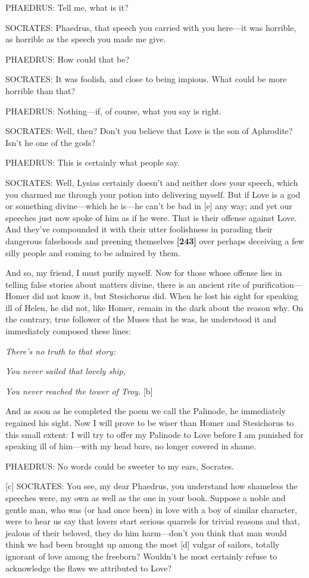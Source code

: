 PHAEDRUS: Tell me, what is it?

SOCRATES: Phaedrus, that speech you carried with you here---it was
horrible, as horrible as the speech you made me give.

PHAEDRUS: How could that be?

SOCRATES: It was foolish, and close to being impious. What could be more
horrible than that?

PHAEDRUS: Nothing---if, of course, what you say is right.

SOCRATES: Well, then? Don't you believe that Love is the son of
Aphrodite? Isn't he one of the gods?

PHAEDRUS: This is certainly what people say.

SOCRATES: Well, Lysias certainly doesn't and neither does your speech,
which you charmed me through your potion into delivering myself. But if
Love is a god or something divine---which he is---he can't be bad in
{[}e{]} any way; and yet our speeches just now spoke of him as if he
were. That is their offense against Love. And they've compounded it with
their utter foolishness in parading their dangerous falsehoods and
preening themselves {\bf {[}243{]}} over perhaps deceiving a few silly
people and coming to be admired by them.

And so, my friend, I must purify myself. Now for those whose offense
lies in telling false stories about matters divine, there is an ancient
rite of purification---Homer did not know it, but Stesichorus did. When
he lost his sight for speaking ill of Helen, he did not, like Homer,
remain in the dark about the reason why. On the contrary, true follower
of the Muses that he was, he understood it and immediately composed
these lines:\crlf
\crlf

{\em There's no truth to that story:}

{\em You never sailed that lovely ship,}

{\em You never reached the tower of
Troy.} {[}b{]}\crlf
\crlf

And as soon as he completed the poem we call the Palinode, he
immediately regained his sight. Now I will prove to be wiser than Homer
and Stesichorus to this small extent: I will try to offer my Palinode to
Love before I am punished for speaking ill of him---with my head bare,
no longer covered in shame.

PHAEDRUS: No words could be sweeter to my ears, Socrates.

{[}c{]} SOCRATES: You see, my dear Phaedrus, you understand how
shameless the speeches were, my own as well as the one in your book.
Suppose a noble and gentle man, who was (or had once been) in love with
a boy of similar character, were to hear us say that lovers start
serious quarrels for trivial reasons and that, jealous of their beloved,
they do him harm---don't you think that man would think we had been
brought up among the most {[}d{]} vulgar of sailors, totally ignorant of
love among the freeborn? Wouldn't he most certainly refuse to
acknowledge the flaws we attributed to Love?

